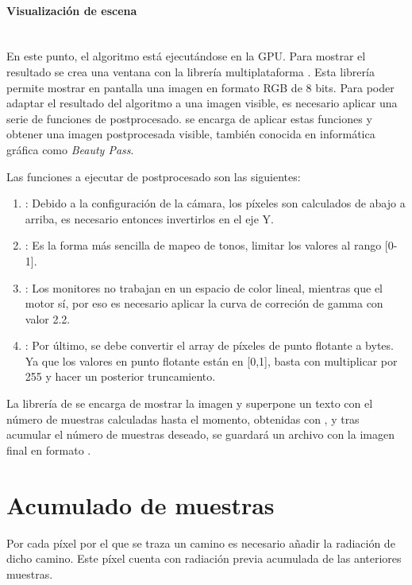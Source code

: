 \paragraph{Visualización de escena}\mbox{} \\

En este punto, el algoritmo está ejecutándose en la GPU. Para mostrar el resultado se crea una ventana con la librería multiplataforma . Esta librería permite mostrar en pantalla una imagen en formato RGB de 8 bits. Para poder adaptar el resultado del algoritmo a una imagen visible, es necesario aplicar una serie de funciones de postprocesado.  se encarga de aplicar estas funciones y obtener una imagen postprocesada visible, también conocida en informática gráfica como \emph{Beauty Pass}.

Las funciones a ejecutar de postprocesado son las siguientes:

\begin{enumerate}
	
	\item {}: Debido a la configuración de la cámara, los píxeles son calculados de abajo a arriba, es necesario entonces invertirlos en el eje Y.
	\item {}: Es la forma más sencilla de mapeo de tonos, limitar los valores al rango [0-1].
	\item {}: Los monitores no trabajan en un espacio de color lineal, mientras que el motor sí, por eso es necesario aplicar la curva de correción de gamma con valor 2.2.
	\item {}: Por último, se debe convertir el array de píxeles de punto flotante a bytes. Ya que los valores en punto flotante están en [0,1], basta con multiplicar por 255 y hacer un posterior truncamiento.

\end{enumerate}

La librería de  se encarga de mostrar la imagen y superpone un texto con el número de muestras calculadas hasta el momento, obtenidas con , y tras acumular el número de muestras deseado, se guardará un archivo con la imagen final en formato .

\section{Acumulado de muestras}
	
Por cada píxel por el que se traza un camino es necesario añadir la radiación de dicho camino. Este píxel cuenta con radiación previa acumulada de las anteriores muestras.

